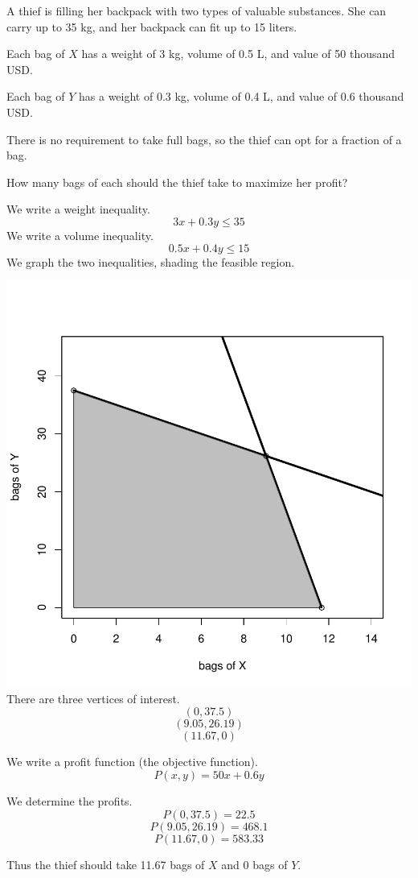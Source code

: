 
\begin{question}
A thief is filling her backpack with two types of valuable substances.
She can carry up to 35 kg, and her backpack can fit up to 15 liters.

Each bag of \(X\) has a weight of 3 kg, volume of 0.5 L, and value of 50
thousand USD.

Each bag of \(Y\) has a weight of 0.3 kg, volume of 0.4 L, and value of
0.6 thousand USD.

There is no requirement to take full bags, so the thief can opt for a
fraction of a bag.

How many bags of each should the thief take to maximize her profit?
\end{question}

\begin{solution}
We write a weight inequality. \[3x+0.3y \le 35\] We write a volume
inequality. \[0.5x+0.4y \le 15\] We graph the two inequalities, shading
the feasible region.

\includegraphics{unnamed-chunk-1-1-3.pdf}\\

There are three vertices of interest. \[(0,37.5) \] \[(9.05,26.19) \]
\[(11.67,0)\]

We write a profit function (the objective function).
\[P(x,y) = 50x+0.6y \]

We determine the profits. \[P(0,37.5)=22.5 \] \[P(9.05,26.19)=468.1 \]
\[P(11.67,0)=583.33 \]

Thus the thief should take 11.67 bags of \(X\) and 0 bags of \(Y\).
\end{solution}

